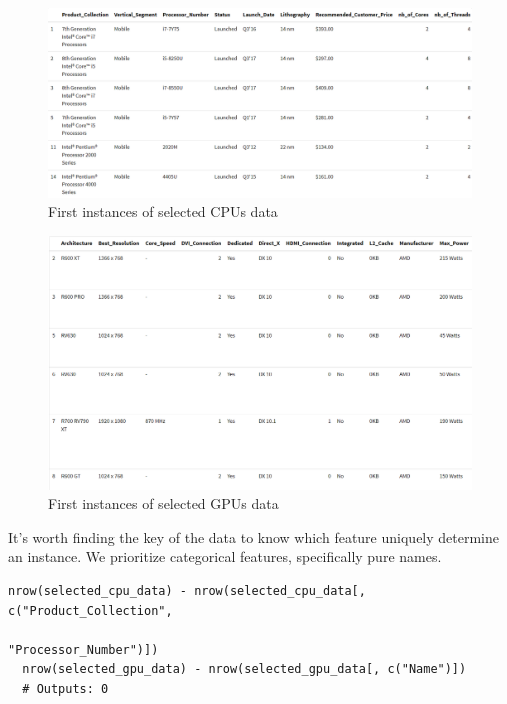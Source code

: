 \begin{figure}[!ht]
  \centering
  \includegraphics[width=\textwidth]{img/cpu-selected-head.png}
  \vspace{0.5cm}
  \caption{First instances of selected CPUs data}
\end{figure}

\begin{figure}[!ht]
  \centering
  \includegraphics[width=\textwidth]{img/gpu-selected-head.png}
  \vspace{0.5cm}
  \caption{First instances of selected GPUs data}
\end{figure}

It's worth finding the key of the data to know which feature uniquely determine an instance. We prioritize categorical features, specifically pure names.

\begin{lstlisting}[caption={Keys of the data}]
  nrow(selected_cpu_data) - nrow(selected_cpu_data[, c("Product_Collection", 
                                                       "Processor_Number")])
  nrow(selected_gpu_data) - nrow(selected_gpu_data[, c("Name")])
  # Outputs: 0
\end{lstlisting}


